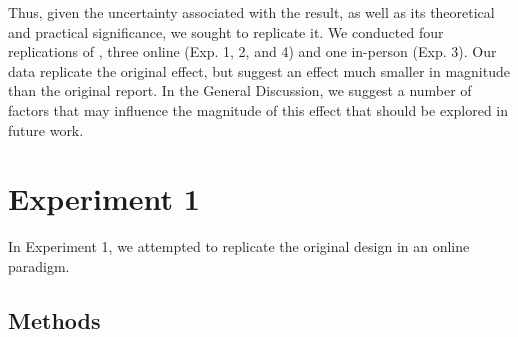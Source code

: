 \documentclass[man]{apa2}
\begin{document}
Thus, given the uncertainty associated with  the  result, as well as its theoretical and practical significance, we sought to replicate it.  We conducted four replications of , three online (Exp. 1, 2, and 4) and one in-person (Exp. 3).  Our data replicate the original effect, but suggest an effect much smaller in magnitude than the original report. In the General Discussion, we suggest a number of factors that may influence the magnitude of this effect that should be explored in future work.








  
\section{Experiment 1} 
In Experiment 1, we attempted to replicate the original design in an online paradigm. 

\subsection{Methods}
\end{document}
